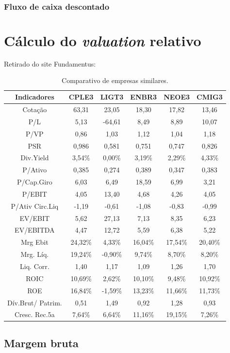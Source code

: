 \documentclass[grad,numbers]{coppe}
\begin{document}
  \hypertarget{fluxo-de-caixa-descontado}{%
  \subsubsection{Fluxo de caixa descontado}\label{fluxo-de-caixa-descontado}}

  \hypertarget{cuxe1lculo-do-valuation-relativo}{%
  \section{\texorpdfstring{Cálculo do \emph{valuation} relativo}{Cálculo do valuation relativo}}\label{cuxe1lculo-do-valuation-relativo}}

  Retirado do site Fundamentus:
  \begin{table}[H]

  \caption{\label{tab:unnamed-chunk-17}Comparativo de empresas similares.}
  \centering
  \begin{tabular}[t]{cccccc}
  \toprule
  Indicadores & CPLE3 & LIGT3 & ENBR3 & NEOE3 & CMIG3\\
  \midrule
  Cotação & 63,31 & 23,05 & 18,30 & 17,82 & 13,46\\
  P/L & 5,13 & -64,61 & 8,49 & 8,89 & 10,07\\
  P/VP & 0,86 & 1,03 & 1,12 & 1,04 & 1,18\\
  PSR & 0,986 & 0,581 & 0,751 & 0,747 & 0,826\\
  Div.Yield & 3,54\% & 0,00\% & 3,19\% & 2,29\% & 4,33\%\\
  \addlinespace
  P/Ativo & 0,385 & 0,274 & 0,389 & 0,347 & 0,383\\
  P/Cap.Giro & 6,03 & 6,49 & 18,59 & 6,99 & 3,21\\
  P/EBIT & 4,05 & 13,40 & 4,68 & 4,26 & 4,05\\
  P/Ativ Circ.Liq & -1,19 & -0,61 & -1,08 & -0,83 & -0,99\\
  EV/EBIT & 5,62 & 27,13 & 7,13 & 8,35 & 6,23\\
  \addlinespace
  EV/EBITDA & 4,47 & 12,72 & 5,59 & 6,38 & 5,22\\
  Mrg Ebit & 24,32\% & 4,33\% & 16,04\% & 17,54\% & 20,40\%\\
  Mrg. Líq. & 19,24\% & -0,90\% & 9,74\% & 8,70\% & 8,20\%\\
  Liq. Corr. & 1,40 & 1,17 & 1,09 & 1,26 & 1,70\\
  ROIC & 10,69\% & 2,62\% & 10,10\% & 9,48\% & 10,92\%\\
  \addlinespace
  ROE & 16,84\% & -1,59\% & 13,23\% & 11,66\% & 11,73\%\\
  Dív.Brut/ Patrim. & 0,51 & 1,49 & 0,92 & 1,28 & 0,93\\
  Cresc. Rec.5a & 7,64\% & 6,64\% & 11,16\% & 19,15\% & 7,26\%\\
  \bottomrule
  \end{tabular}
  \end{table}
  \hypertarget{margem-bruta}{%
  \subsection{Margem bruta}\label{margem-bruta}}
\end{document}
